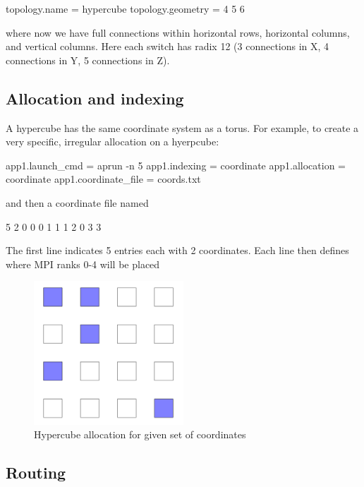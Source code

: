 \begin{ViFile}
topology.name = hypercube
topology.geometry = 4 5 6
\end{ViFile}

where now we have full connections within horizontal rows, horizontal columns, and vertical columns.
Here each switch has radix 12 (3 connections in X, 4 connections in Y, 5 connections in Z). 

\subsection{Allocation and indexing}
\label{subsec:hypercube:allocation}

A hypercube has the same coordinate system as a torus. For example, to create a very specific, irregular allocation on a hyerpcube:

\begin{ViFile}
app1.launch_cmd = aprun -n 5
app1.indexing = coordinate
app1.allocation = coordinate
app1.coordinate_file = coords.txt
\end{ViFile}
and then a coordinate file named 

\begin{ViFile}
5 2
0 0
0 1
1 1
2 0
3 3
\end{ViFile}
The first line indicates 5 entries each with 2 coordinates.
Each line then defines where MPI ranks 0-4 will be placed

\begin{figure}[h!]
\centering
\includegraphics[width=0.5\textwidth]{figures/tikz/hypercube/hypercube_allocation.png}
\caption{Hypercube allocation for given set of coordinates}
\label{fig:topologies:hypercubeAllocation}
\end{figure}

\subsection{Routing}
\label{subsec:hypercube:routing}

